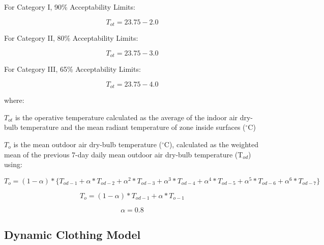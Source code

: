 For Category I, 90\% Acceptability Limits:

\begin{equation}
T_{ot} = 23.75 - 2.0
\end{equation}

For Category II, 80\% Acceptability Limits:

\begin{equation}
T_{ot} = 23.75 - 3.0
\end{equation}

For Category III, 65\% Acceptability Limits:

\begin{equation}
T_{ot} = 23.75 - 4.0
\end{equation}

where:

\({T_{ot}}\) is the operative temperature calculated as the average of the indoor air dry-bulb temperature and the mean radiant temperature of zone inside surfaces (\(^{\circ}\)C)

\(T_o\) is the mean outdoor air dry-bulb temperature (\(^{\circ}\)C), calculated as the weighted mean of the previous 7-day daily mean outdoor air dry-bulb temperature (T\(_{od}\)) using:

\begin{equation}
T_{o} = (1 - \alpha) * \{T_{od-1} + \alpha * T_{od-2} + \alpha^{2} * T_{od-3} + \alpha^{3} * T_{od-4} + \alpha^{4} * T_{od-5} + \alpha^{5} * T_{od-6} + \alpha^{6} * T_{od-7}\}
\end{equation}

\begin{equation}
T_{o} = (1 - \alpha) * T_{od-1} + \alpha * T_{o-1}
\end{equation}

\begin{equation}
\alpha = 0.8
\end{equation}

\subsection{Dynamic Clothing Model}\label{dynamic-clothing-model}

